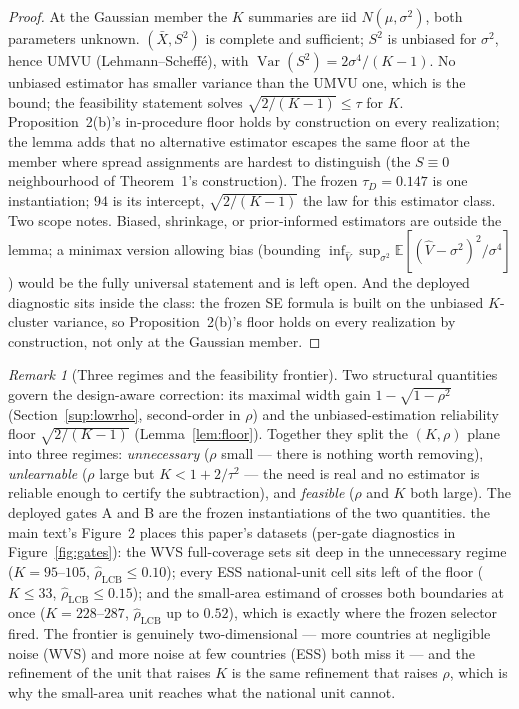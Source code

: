 \documentclass[12pt]{article}
\theoremstyle{definition}
\theoremstyle{remark}
\newtheorem{remark}{Remark}
\newcommand{\rhohat}{\widehat{\rho}}
\begin{document}
\begin{proof}
At the Gaussian member the $K$ summaries are iid $N(\mu,\sigma^2)$, both
parameters unknown. $(\bar X, S^2)$ is complete and sufficient; $S^2$ is
unbiased for $\sigma^2$, hence UMVU (Lehmann--Scheff\'e), with
$\operatorname{Var}(S^2)=2\sigma^4/(K-1)$. No unbiased estimator has smaller
variance than the UMVU one, which is the bound; the feasibility statement
solves $\sqrt{2/(K-1)}\le\tau$ for $K$. Proposition~2(b)'s in-procedure floor
holds by construction on every realization; the lemma adds that no alternative
estimator escapes the same floor at the member where spread assignments are
hardest to distinguish (the $S\equiv0$ neighbourhood of Theorem~1's
construction). The frozen $\tau_D=0.147$ is one instantiation; $94$ is its
intercept, $\sqrt{2/(K-1)}$ the law for this estimator class. Two scope
notes. Biased, shrinkage, or prior-informed estimators are outside the
lemma; a minimax version allowing bias (bounding
$\inf_{\widehat V}\sup_{\sigma^2}\mathbb E[(\widehat V-\sigma^2)^2/\sigma^4]$)
would be the fully universal statement and is left open. And the deployed
diagnostic sits inside the class: the frozen SE formula is built on the
unbiased $K$-cluster variance, so Proposition~2(b)'s floor holds on every
realization by construction, not only at the Gaussian member.
\end{proof}

\begin{remark}[Three regimes and the feasibility frontier]\label{rem:frontier}
Two structural quantities govern the design-aware correction: its maximal width
gain $1-\sqrt{1-\rho^2}$ (Section~\ref{sup:lowrho}, second-order in $\rho$) and the
unbiased-estimation reliability floor $\sqrt{2/(K-1)}$ (Lemma~\ref{lem:floor}). Together they split
the $(K,\rho)$ plane into three regimes: \emph{unnecessary} ($\rho$ small ---
there is nothing worth removing), \emph{unlearnable} ($\rho$ large but
$K<1+2/\tau^2$ --- the need is real and no estimator is reliable enough to
certify the subtraction), and \emph{feasible} ($\rho$ and $K$ both large). The
deployed gates A and B are the frozen instantiations of the two quantities.
the main text's Figure~2 places this paper's datasets (per-gate
diagnostics in Figure~\ref{fig:gates}): the WVS
full-coverage sets sit deep in the unnecessary regime ($K=95$--$105$,
$\rhohat_{\mathrm{LCB}}\le0.10$); every ESS national-unit cell sits left of the
floor ($K\le33$, $\rhohat_{\mathrm{LCB}}\le0.15$); and the small-area estimand
of crosses both boundaries at once ($K=228$--$287$,
$\rhohat_{\mathrm{LCB}}$ up to $0.52$), which is exactly where the frozen
selector fired. The frontier is genuinely two-dimensional --- more countries at
negligible noise (WVS) and more noise at few countries (ESS) both miss it ---
and the refinement of the unit that raises $K$ is the same refinement that
raises $\rho$, which is why the small-area unit reaches what the national unit
cannot.
\end{remark}
\end{document}
